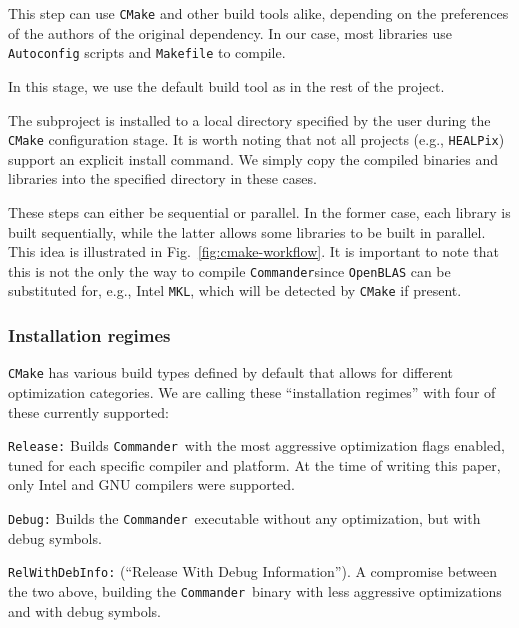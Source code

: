 \documentclass[twocolumn]{aa}
\def\commander{\texttt{Commander}}
\begin{document}
 This step can use \texttt{CMake} and other build tools alike, depending on the preferences of the authors of the original dependency. In our case, most libraries use \texttt{Autoconfig} scripts and \texttt{Makefile} to compile.

 In this stage, we use the default build tool as in the rest of the project.

 The subproject is installed to a local directory specified by the user during the \texttt{CMake} configuration stage. It is worth noting that not all projects (e.g., \texttt{HEALPix}) support an explicit install command. We simply copy the compiled binaries and libraries into the specified directory in these cases.

These steps can either be sequential or parallel. In the former case,  each library is built sequentially, while the latter allows some libraries to be built in parallel. This idea is illustrated in  Fig.~\ref{fig:cmake-workflow}. It is important to note that this is not the only the way to compile \commander since \texttt{OpenBLAS}  can be substituted for, e.g., Intel \texttt{MKL}, which will be detected by \texttt{CMake} if present. 




\subsubsection{Installation regimes}
\label{cmake-installation-regimes}

\texttt{CMake} has various build types defined by default that allows for different optimization categories. We are calling these ``installation regimes'' with four of these currently supported:

\texttt{Release:} Builds \commander\ with the most aggressive optimization flags enabled, tuned for each specific compiler and platform. At the time of writing this paper, only Intel and GNU compilers were supported.

\texttt{Debug:} Builds the \commander\ executable without any optimization, but with debug symbols.

\texttt{RelWithDebInfo:} (``Release With Debug Information''). A compromise between the two above, building the \commander\ binary with less aggressive optimizations and with debug symbols.
\end{document}
